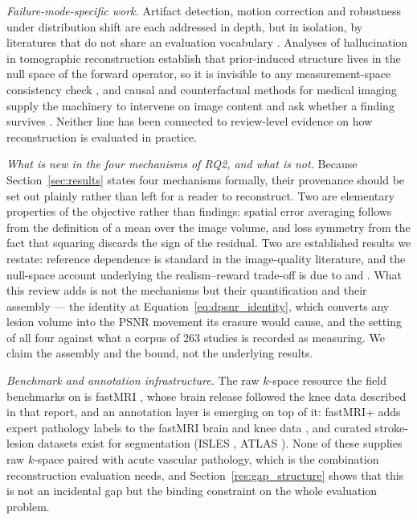\documentclass[review,authoryear]{elsarticle}
\begin{document}
\emph{Failure-mode-specific work.} Artifact detection, motion correction and robustness
under distribution shift are each addressed in depth, but in isolation, by literatures
that do not share an evaluation vocabulary
\citep{esteban2017mriqc,sommer2020correction,gngr2023adaptive}. Analyses of
hallucination in tomographic reconstruction establish that prior-induced structure lives
in the null space of the forward operator, so it is invisible to any
measurement-space consistency check
\citep{bhadra2021hallucinations,gottschling2020troublesome}, and causal and counterfactual
methods for medical imaging supply the machinery to intervene on image content and ask
whether a finding survives
\citep{pawlowski2020deep,castro2020causality,sanchez2022healthy,wei2026latent}. Neither
line has been connected to review-level evidence on how reconstruction is evaluated in
practice.

\emph{What is new in the four mechanisms of RQ2, and what is not.} Because
Section~\ref{sec:results} states four mechanisms formally, their provenance should be
set out plainly rather than left for a reader to reconstruct. Two are elementary
properties of the objective rather than findings: spatial error averaging follows from
the definition of a mean over the image volume, and loss symmetry from the fact that
squaring discards the sign of the residual. Two are established results we restate:
reference dependence is standard in the image-quality literature, and the null-space
account underlying the realism--reward trade-off is due to
\citet{bhadra2021hallucinations} and \citet{gottschling2020troublesome}. What this review adds
is not the mechanisms but their quantification and their assembly --- the identity at
Equation~\eqref{eq:dpsnr_identity}, which converts any lesion volume into the PSNR
movement its erasure would cause, and the setting of all four against what a corpus of
263 studies is recorded as measuring. We claim the assembly and the bound, not the
underlying results.

\emph{Benchmark and annotation infrastructure.} The raw $k$-space resource the field
benchmarks on is fastMRI \citep{knoll2020fastmri}, whose brain release followed the knee
data described in that report, and an annotation layer is emerging
on top of it: fastMRI+ adds expert pathology labels to the fastMRI brain and knee data
\citep{zhao2022fastmriplus}, and curated stroke-lesion datasets exist for segmentation
(ISLES \citep{petzsche2022isles}, ATLAS \citep{liew2022atlas}). None of these supplies
raw $k$-space paired with acute vascular pathology, which is the combination
reconstruction evaluation needs, and Section~\ref{res:gap_structure} shows that this is
not an incidental gap but the binding constraint on the whole evaluation problem.
\end{document}
